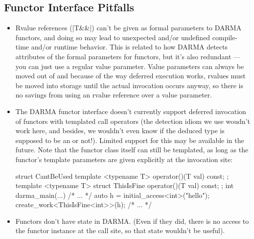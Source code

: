 \subsection{Functor Interface Pitfalls}

\begin{itemize}
  \item Rvalue references (|T&&|) can't be given as formal parameters to
    \gls{DARMA} functors, and doing so may lead to unexpected and/or undefined compile-time
    and/or runtime behavior.  This is related to how \gls{DARMA} detects attributes of
  the formal parameters for functors, but it's also redundant --- you can just
  use a regular value parameter.  Value parameters can always be moved out of 
  and because of the way \gls{deferred execution} works, rvalues must be moved into
  storage until the actual invocation occurs anyway, so there is no savings
  from using an rvalue reference over a value parameter.
\item The \gls{DARMA} functor interface doesn't currently support deferred
  invocation of functors with templated call operators (the detection idiom we
  use woudn't work here, and besides, we wouldn't even know if the deduced type
  is supposed to be an  or not!).  Limited support for this may be
  available in the future.  Note that the functor class itself can still be
  templated, as long as the functor's template parameters are given explicitly
  at the invocation site:
\begin{CppCodeNumb}
struct CantBeUsed {
  template <typename T>
  operator()(T val) const;
};
template <typename T>
struct ThisIsFine {
  operator()(T val) const;
};
int darma_main(...) {
  /* ... */
  auto h = initial_access<int>("hello");
  create_work<ThisIsFine<int>>(h);
  /* ... */
}
\end{CppCodeNumb}
  \item Functors don't have state in \gls{DARMA}.  (Even if they did, there is no
  access to the functor instance at the call site, so that state wouldn't be useful).
\end{itemize}

\lstDeleteShortInline{\|}
